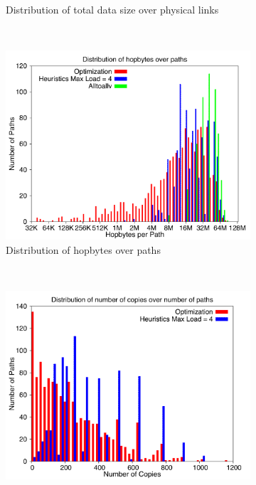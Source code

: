 \begin{figure}[!htbp]
\begin{subfigure}[b]{0.49\textwidth}
                \caption{Distribution of total data size over physical links}
                \label{fig:27_1024_loaddata}
        \end{subfigure}
        ~ %
        \begin{subfigure}[b]{0.49\textwidth}
                \includegraphics[width=\textwidth]{report_figures/constantr/27_1024/hopbyte_histo.pdf}
                \caption{Distribution of hopbytes over paths}
                \label{fig:27_1024_hopbyte}
        \end{subfigure}
        ~ %
        \begin{subfigure}[b]{0.49\textwidth}
                \includegraphics[width=\textwidth]{report_figures/constantr/27_1024/hopcopy_histo.pdf}

\end{subfigure}
\end{figure}
